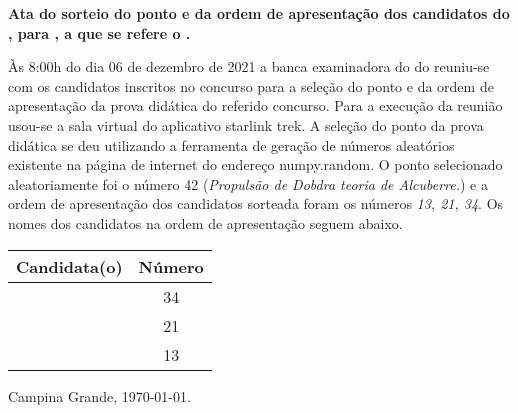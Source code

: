 \documentclass[12pt]{uaefata}
\date{} %
\begin{document}
\begin{letter}{
		\textbf{Ata do sorteio do ponto e da ordem de apresentação dos candidatos do \concurso, para \cargo,  a que se refere o \edital.}
	}
 
\opening{}

Às 8:00h do dia 06 de dezembro de 2021 a banca examinadora do \concurso do \edital reuniu-se com os candidatos inscritos no concurso para a seleção do ponto e da ordem de apresentação da prova didática do referido concurso. Para a execução da reunião usou-se a sala virtual do aplicativo starlink trek. A seleção do ponto da prova didática se deu utilizando a ferramenta de geração de números aleatórios existente na página de internet do endereço numpy.random. O ponto selecionado aleatoriamente foi o número 42 (\textit{Propulsão de Dobdra teoria de Alcuberre.}) e a ordem de apresentação dos candidatos sorteada foram os números \textit{13, 21, 34}. Os nomes dos candidatos na ordem de apresentação seguem abaixo.

\centering

\begin{tabular}{|l|c|}
	\hline
	\textbf{Candidata(o)} & \textbf{Número}\\
	\hline
	\cdta & 34\\
	\cdtb & 21 \\
	\cdtc & 13 \\
	\hline
\end{tabular} 



\closing{Campina Grande, \today.}




\end{letter}
\end{document}
